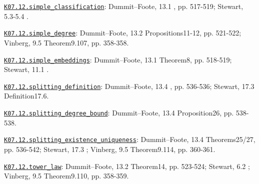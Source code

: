 \par\smallskip\noindent\hypertarget{src:K07.12.simple_classification}{}\label{src:K07.12.simple_classification}\hyperref[K07.12.simple_classification]{\texttt{K07.12.simple\_classification}}: Dummit--Foote, 13.1 , pp. 517-519; Stewart, 5.3-5.4 .
\par\smallskip\noindent\hypertarget{src:K07.12.simple_degree}{}\label{src:K07.12.simple_degree}\hyperref[K07.12.simple_degree]{\texttt{K07.12.simple\_degree}}: Dummit--Foote, 13.2 Propositions11-12, pp. 521-522; Vinberg, 9.5 Theorem9.107, pp. 358-358.
\par\smallskip\noindent\hypertarget{src:K07.12.simple_embeddings}{}\label{src:K07.12.simple_embeddings}\hyperref[K07.12.simple_embeddings]{\texttt{K07.12.simple\_embeddings}}: Dummit--Foote, 13.1 Theorem8, pp. 518-519; Stewart, 11.1 .
\par\smallskip\noindent\hypertarget{src:K07.12.splitting_definition}{}\label{src:K07.12.splitting_definition}\hyperref[K07.12.splitting_definition]{\texttt{K07.12.splitting\_definition}}: Dummit--Foote, 13.4 , pp. 536-536; Stewart, 17.3 Definition17.6.
\par\smallskip\noindent\hypertarget{src:K07.12.splitting_degree_bound}{}\label{src:K07.12.splitting_degree_bound}\hyperref[K07.12.splitting_degree_bound]{\texttt{K07.12.splitting\_degree\_bound}}: Dummit--Foote, 13.4 Proposition26, pp. 538-538.
\par\smallskip\noindent\hypertarget{src:K07.12.splitting_existence_uniqueness}{}\label{src:K07.12.splitting_existence_uniqueness}\hyperref[K07.12.splitting_existence_uniqueness]{\texttt{K07.12.splitting\_existence\_uniqueness}}: Dummit--Foote, 13.4 Theorems25/27, pp. 536-542; Stewart, 17.3 ; Vinberg, 9.5 Theorem9.114, pp. 360-361.
\par\smallskip\noindent\hypertarget{src:K07.12.tower_law}{}\label{src:K07.12.tower_law}\hyperref[K07.12.tower_law]{\texttt{K07.12.tower\_law}}: Dummit--Foote, 13.2 Theorem14, pp. 523-524; Stewart, 6.2 ; Vinberg, 9.5 Theorem9.110, pp. 358-359.
